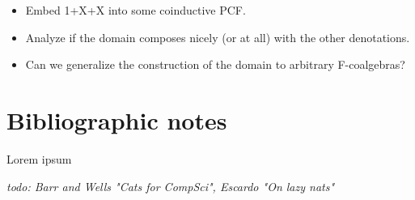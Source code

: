 \documentclass[a4paper]{article}
\newcommand{\todo}[1]{\bigskip \noindent \emph{todo: #1}}
\begin{document}
\begin{itemize}
\item Embed 1+X+X into some coinductive PCF.
\item Analyze if the domain composes nicely (or at all) with the other
denotations.
\item Can we generalize the construction of the domain to arbitrary
F-coalgebras?
\end{itemize}

\section{Bibliographic notes}

Lorem ipsum \cite{Pierce1991} \cite{Gunter1992} \cite{Bird1997}
\cite{Mitchell1996} \cite{Allison1986} \cite{Capretta2002}

\todo{Barr and Wells "Cats for CompSci", Escardo "On lazy nats"}



\end{document}
